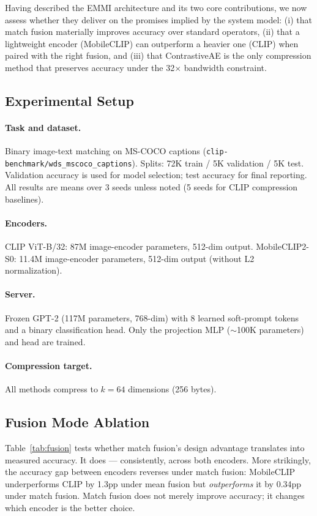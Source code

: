 \documentclass[10pt,twocolumn]{article}
\begin{document}
Having described the EMMI architecture and its two core contributions,
we now assess whether they deliver on the promises implied by the
system model: (i) that match fusion materially improves accuracy
over standard operators, (ii) that a lightweight encoder (MobileCLIP)
can outperform a heavier one (CLIP) when paired with the right fusion,
and (iii) that ContrastiveAE is the only compression method that
preserves accuracy under the 32$\times$ bandwidth constraint.

\subsection{Experimental Setup}

\paragraph{Task and dataset.}
Binary image-text matching on MS-COCO captions
(\texttt{clip-benchmark/wds\_mscoco\_captions}).
Splits: 72K train / 5K validation / 5K test. Validation accuracy
is used for model selection; test accuracy for final reporting.
All results are means over 3 seeds unless noted (5 seeds for CLIP
compression baselines).

\paragraph{Encoders.}
CLIP ViT-B/32: 87M image-encoder parameters, 512-dim output.
MobileCLIP2-S0: 11.4M image-encoder parameters, 512-dim output
(without L2 normalization).

\paragraph{Server.}
Frozen GPT-2 (117M parameters, 768-dim) with 8 learned soft-prompt
tokens and a binary classification head. Only the projection MLP
($\sim$100K parameters) and head are trained.

\paragraph{Compression target.}
All methods compress to $k{=}64$ dimensions (256 bytes).

\subsection{Fusion Mode Ablation}

Table~\ref{tab:fusion} tests whether match fusion's design advantage
translates into measured accuracy. It does --- consistently, across both
encoders. More strikingly, the accuracy gap between encoders reverses
under match fusion: MobileCLIP underperforms CLIP by 1.3pp under mean
fusion but \emph{outperforms} it by 0.34pp under match fusion.
Match fusion does not merely improve accuracy; it changes which encoder
is the better choice.
\end{document}
